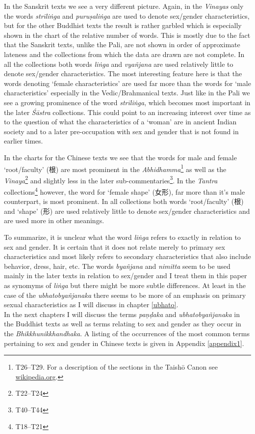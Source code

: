 In the Sanskrit texts we see a very different picture. Again, in the \textit{Vinayas} only the words \textit{strīliṅga} and \textit{puruṣaliṅga} are used to denote sex/gender characteristics, but for the other Buddhist texts the result is rather garbled which is especially shown in the chart of the relative number of words. This is mostly due to the fact that the Sanskrit texts, unlike the Pali, are not shown in order of approximate lateness and the collections from which the data are drawn are not complete. In all the collections both words \textit{liṅga} and \textit{vyañjana} are used relatively little to denote sex/gender characteristics. The most interesting feature here is that the words denoting `female characteristics' are used far more than the words for `male characteristics' especially in the Vedic/Brahmanical texts. Just like in the Pali we see a growing prominence of the word \textit{strīliṅga}, which becomes most important in the later \textit{Śāstra} collections. This could point to an increasing interest over time as to the question of what the characteristics of a `woman' are in ancient Indian society and to a later pre-occupation with sex and gender that is not found in earlier times.

In the charts for the Chinese texts we see that the words for male and female `root/faculty' (根) are most prominent in the \textit{Abhidhamma}\footnote{T26–T29. For a description of the sections in the Taishō Canon see \href{https://en.wikipedia.org/wiki/Taishō_Tripiṭaka}{wikipedia.org}.} as well as the \textit{Vinaya}\footnote{T22–T24} and slightly less in the later sub-commentaries\footnote{T40–T44}. In the \textit{Tantra} collections\footnote{T18–T21} however, the word for `female shape' (女形), far more than it's male counterpart, is most prominent. In all collections both words `root/faculty' (根) and `shape' (形) are used relatively little to denote sex/gender characteristics and are used more in other meanings.

To summarize, it is unclear what the word \textit{liṅga} refers to exactly in relation to sex and gender. It is certain that it does not relate merely to primary sex characteristics and most likely refers to secondary characteristics that also include behavior, dress, hair, etc. The words \textit{byañjana} and \textit{nimitta} seem to be used mainly in the later texts in relation to sex/gender and I treat them in this paper as synomyms of \textit{liṅga} but there might be more subtle differences. At least in the case of the \textit{ubhatob­yañ­janaka} there seems to be more of an emphasis on primary sexual characteristics as I will discuss in chapter \ref{ubhato}.\\

In the next chapters I will discuss the terms \textit{paṇḍaka} and \textit{ubhatob­yañ­janaka} in the Buddhist texts as well as terms relating to sex and gender as they occur in the \textit{Bhikkhunikkhandhaka}. A listing of the occurrences of the most common terms pertaining to sex and gender in Chinese texts is given in Appendix \ref{appendix1}. 

